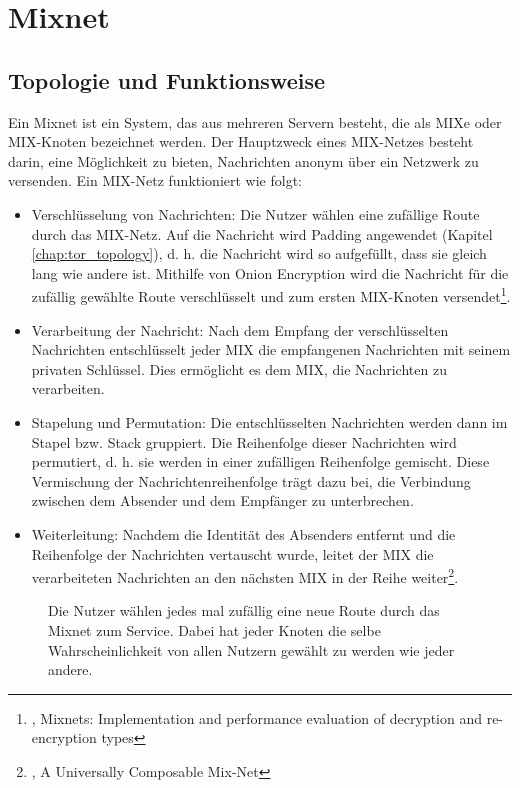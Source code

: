 \section{Mixnet}
\label{chap:mixnet}

\subsection{Topologie und Funktionsweise}
\label{chap:mixnet_topology}

Ein Mixnet ist ein System, das aus mehreren Servern besteht, die als MIXe oder MIX-Knoten bezeichnet werden.  Der Hauptzweck eines MIX-Netzes besteht darin, eine Möglichkeit zu bieten, Nachrichten anonym über ein Netzwerk zu versenden.
Ein MIX-Netz funktioniert wie folgt:

\begin{itemize}
    \item Verschlüsselung von Nachrichten: Die Nutzer wählen eine zufällige Route durch das MIX-Netz. Auf die Nachricht wird Padding angewendet (Kapitel \ref{chap:tor_topology}), d. h. die Nachricht wird so aufgefüllt, dass sie gleich lang wie andere ist. Mithilfe von Onion Encryption wird die Nachricht für die zufällig gewählte Route verschlüsselt und zum ersten MIX-Knoten versendet\footnote{\cite{OnionEncryptionMixnet}, Mixnets: Implementation and performance evaluation of decryption and re-encryption types}.
    \item Verarbeitung der Nachricht: Nach dem Empfang der verschlüsselten Nachrichten entschlüsselt jeder MIX die empfangenen Nachrichten mit seinem privaten Schlüssel. Dies ermöglicht es dem MIX, die Nachrichten zu verarbeiten.
    \item Stapelung und Permutation: Die entschlüsselten Nachrichten werden dann im Stapel bzw. Stack gruppiert. Die Reihenfolge dieser Nachrichten wird permutiert, d. h. sie werden in einer zufälligen Reihenfolge gemischt. Diese Vermischung der Nachrichtenreihenfolge trägt dazu bei, die Verbindung zwischen dem Absender und dem Empfänger zu unterbrechen.
    \item Weiterleitung: Nachdem die Identität des Absenders entfernt und die Reihenfolge der Nachrichten vertauscht wurde, leitet der MIX die verarbeiteten Nachrichten an den nächsten MIX in der Reihe weiter\footnote{\cite{ComposableMixNet}, A Universally Composable Mix-Net}.
\end{itemize}

\begin{figure}[h!]
    \centering
    
    \caption{Die Nutzer wählen jedes mal zufällig eine neue Route durch das Mixnet zum Service. Dabei hat jeder Knoten die selbe Wahrscheinlichkeit von allen Nutzern gewählt zu werden wie jeder andere.}
    \label{imgs:mixnet}
\end{figure}

